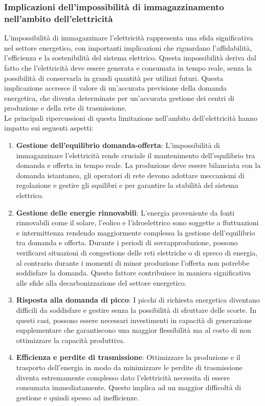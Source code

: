 \documentclass{article}
\begin{document}
\subsubsection{Implicazioni dell'impossibilità di immagazzinamento nell'ambito dell'elettricità}
L'impossibilità di immagazzinare l'elettricità rappresenta una sfida significativa nel settore energetico, con importanti implicazioni che riguardano l'affidabilità, l'efficienza e la sostenibilità del sistema elettrico. Questa impossibilità deriva dal fatto che l'elettricità deve essere generata e consumata in tempo reale, senza la possibilità di conservarla in grandi quantità per utilizzi futuri. Questa implicazione accresce il valore di un’accurata previsione della domanda energetica, che diventa determinate per un’accurata gestione dei centri di produzione e della rete di trasmissione.\\
Le principali ripercussioni di questa limitazione nell'ambito dell'elettricità hanno impatto sui seguenti aspetti:
\begin{enumerate}
    \item \textbf{Gestione dell'equilibrio domanda-offerta}: L'impossibilità di immagazzinare l'elettricità rende cruciale il mantenimento dell'equilibrio tra domanda e offerta in tempo reale. La produzione deve essere bilanciata con la domanda istantanea, gli operatori di rete devono adottare meccanismi di regolazione e gestire gli squilibri e per garantire la stabilità del sistema elettrico.
    \item \textbf{Gestione delle energie rinnovabili}: L’energia proveniente da fonti rinnovabili come il solare, l’eolico e l’idroelettrico sono soggette a fluttuazioni e intermittenza rendendo maggiormente complessa la gestione dell’equilibrio tra domanda e offerta. Durante i periodi di sovrapproduzione, possono verificarsi situazioni di congestione delle reti elettriche o di spreco di energia, al contrario durante i momenti di minor produzione l’offerta non potrebbe soddisfare la domanda. Questo fattore contribuisce in maniera significativa alle sfide alla decarbonizzazione del settore energetico.
    \item \textbf{Risposta alla domanda di picco}: I picchi di richiesta energetica diventano difficili da soddisfare e gestire senza la possibilità di sfruttare delle scorte. In questi casi, possono essere necessari investimenti in capacità di generazione supplementare che garantiscono una maggior flessibilità ma al costo di non ottimizzare la capacità produttiva.
    \item \textbf{Efficienza e perdite di trasmissione}: Ottimizzare la produzione e il trasporto dell'energia in modo da minimizzare le perdite di trasmissione diventa estremamente complesso dato l’elettricità necessita di essere consumata immediatamente. Questo implica ad un maggior difficoltà di gestione e quindi spesso ad inefficienze.
\end{enumerate}
\newpage
\end{document}
